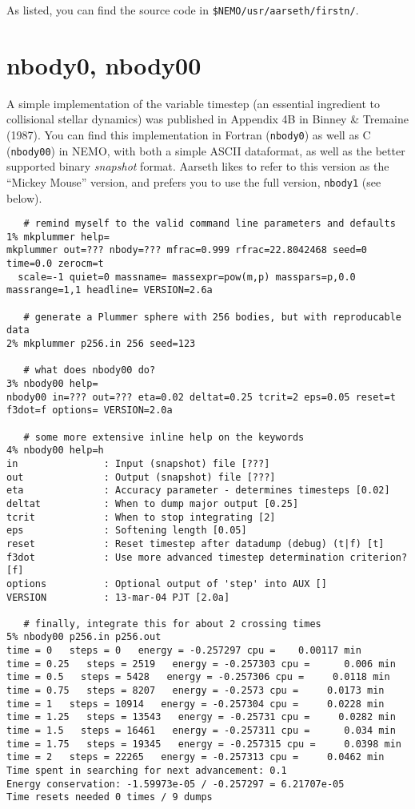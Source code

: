 As listed, you can find the source code in {\tt \$NEMO/usr/aarseth/firstn/}.

\section{nbody0, nbody00}

A simple implementation of the variable timestep (an essential ingredient
to collisional stellar dynamics) was published in Appendix 4B in
Binney \& Tremaine (1987). 
You can find this implementation in Fortran ({\tt nbody0})
as well as C ({\tt nbody00}) in NEMO, with both a simple ASCII dataformat,
as well as the better supported binary {\it snapshot} format. Aarseth likes
to refer to this version as the ``Mickey Mouse'' version, and prefers
you to use the full version, {\tt nbody1} (see below).


\footnotesize\begin{verbatim}
   # remind myself to the valid command line parameters and defaults
1% mkplummer help=
mkplummer out=??? nbody=??? mfrac=0.999 rfrac=22.8042468 seed=0 time=0.0 zerocm=t 
  scale=-1 quiet=0 massname= massexpr=pow(m,p) masspars=p,0.0 massrange=1,1 headline= VERSION=2.6a

   # generate a Plummer sphere with 256 bodies, but with reproducable data
2% mkplummer p256.in 256 seed=123

   # what does nbody00 do?
3% nbody00 help=
nbody00 in=??? out=??? eta=0.02 deltat=0.25 tcrit=2 eps=0.05 reset=t f3dot=f options= VERSION=2.0a

   # some more extensive inline help on the keywords
4% nbody00 help=h
in               : Input (snapshot) file [???]
out              : Output (snapshot) file [???]
eta              : Accuracy parameter - determines timesteps [0.02]
deltat           : When to dump major output [0.25]
tcrit            : When to stop integrating [2]
eps              : Softening length [0.05]
reset            : Reset timestep after datadump (debug) (t|f) [t]
f3dot            : Use more advanced timestep determination criterion? [f]
options          : Optional output of 'step' into AUX []
VERSION          : 13-mar-04 PJT [2.0a]

   # finally, integrate this for about 2 crossing times
5% nbody00 p256.in p256.out
time = 0   steps = 0   energy = -0.257297 cpu =    0.00117 min
time = 0.25   steps = 2519   energy = -0.257303 cpu =      0.006 min
time = 0.5   steps = 5428   energy = -0.257306 cpu =     0.0118 min
time = 0.75   steps = 8207   energy = -0.2573 cpu =     0.0173 min
time = 1   steps = 10914   energy = -0.257304 cpu =     0.0228 min
time = 1.25   steps = 13543   energy = -0.25731 cpu =     0.0282 min
time = 1.5   steps = 16461   energy = -0.257311 cpu =      0.034 min
time = 1.75   steps = 19345   energy = -0.257315 cpu =     0.0398 min
time = 2   steps = 22265   energy = -0.257313 cpu =     0.0462 min
Time spent in searching for next advancement: 0.1
Energy conservation: -1.59973e-05 / -0.257297 = 6.21707e-05
Time resets needed 0 times / 9 dumps


\end{verbatim}\normalsize


